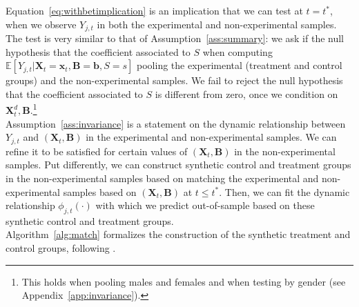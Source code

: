 \noindent Equation~\eqref{eq:withbetimplication} is an implication that we can test at $t = t^*$, when we observe $Y_{j,t}$ in both the experimental and non-experimental samples. The test is very similar to that of Assumption~\ref{ass:summary}: we ask if the null hypothesis that the coefficient associated to $S$ when computing $\mathbb{E} \left[ Y_{j,t} | \bm{X}_{t}  = \bm{x}_{t}, \bm{B} =  \bm{b}, S = s \right]$ pooling the experimental (treatment and control groups) and the non-experimental samples. We fail to reject the null  hypothesis that the coefficient associated to $S$ is different from zero, once we condition on $\bm{X}_{t}^d, \bm{B}$.\footnote{This holds when pooling males and females and when testing by gender (see Appendix~\ref{app:invariance}).}\\

\noindent Assumption~\ref{ass:invariance} is a statement on the dynamic relationship between $Y_{j,t}$ and $\left( \bm{X}_{t}, \bm{B} \right)$ in the experimental and non-experimental samples. We can refine it to be satisfied for certain values of $\left( \bm{X}_{t}, \bm{B} \right)$ in the non-experimental samples. Put differently, we can construct synthetic control and treatment groups in the non-experimental samples based on matching the experimental and non-experimental samples based on $\left( \bm{X}_{t}, \bm{B} \right)$ at $t \leq t^*$. Then, we can fit the dynamic relationship $\phi_{j,t} \left( \cdot \right)$ with which we predict out-of-sample based on these synthetic control and treatment groups.\\

\noindent Algorithm~\ref{alg:match} formalizes the construction of the synthetic treatment and control groups, following \citet{Heckman_Ichimura_etal_1998_REStud}.

